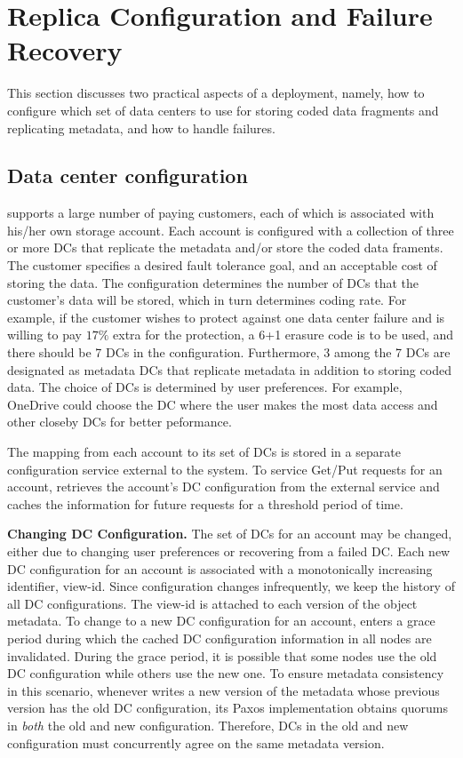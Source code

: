 \section{Replica Configuration and Failure Recovery}

This section discusses two practical aspects of a {\name} deployment, namely,
how to configure which set of data centers to use for storing coded data
fragments and replicating metadata, and how to handle failures.

\subsection{Data center configuration}
\label{subsec:config}

\name supports a large number of paying customers, each of which is associated
with his/her own storage account.  Each \name account is configured with a
collection of three or more DCs that replicate the metadata and/or store the
coded data framents.  The customer specifies a desired fault tolerance goal, and an acceptable cost
of storing the data. The configuration determines the number of DCs that the customer's data will be stored, which in turn determines coding rate. For example, if the customer wishes to protect against
one data center failure and is willing to pay $17\%$ extra for the protection,
a 6+1 erasure code is to be used, and there should be 7 DCs in the configuration.  
Furthermore, 3 among the 7 DCs are designated as metadata DCs that replicate 
metadata in addition to storing coded data.
The choice of DCs is determined by user preferences. For
example, OneDrive could choose the DC where the user makes the most data access and 
other closeby DCs for better peformance.

The mapping from each \name account to its set of DCs is stored in a
separate configuration service external to the \name system.  To service
Get/Put requests for an account, \name retrieves the account's DC configuration
from the external service and caches the information for future requests for a
threshold period of time.

{\bf Changing DC Configuration.} 
The set of DCs for an account may be changed, either due to changing user
preferences or recovering from a failed DC.  Each new DC configuration for an
account is associated with a monotonically increasing identifier, view-id.
Since configuration changes infrequently, we keep the history of all DC configurations.  The view-id is
attached to each version of the object metadata. To change to a new DC
configuration for an account, \name enters a grace period during which the
cached DC configuration information in all {\name} nodes are invalidated.
During the grace period, it is possible that some nodes use the old DC configuration
while others use the new one. To ensure metadata consistency in this scenario,
whenever \name writes a new version of the metadata whose previous version has
the old DC configuration, its Paxos implementation obtains quorums in {\em
both} the old and new configuration.  Therefore, DCs in the old and new
configuration must concurrently agree on the same metadata version.

